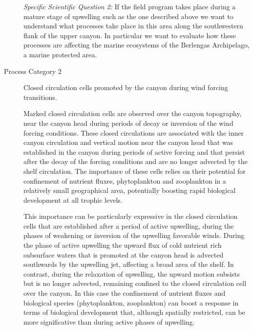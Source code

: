 \begin{description}
 
\textsl{Specific Scientific Question 2:} If the \proj field program
takes place during a mature stage of upwelling such as the one
described above we want to understand what processes take place in
this area along the southwestern flank of the upper \naz canyon. In
particular we want to evaluate how these processes are affecting the
marine ecosystems of the Berlengas Archipelago, a marine protected
area.

\item[Process Category 2] Closed circulation cells promoted by the
canyon during wind forcing transitions.

Marked closed circulation cells are observed over the canyon
topography, near the canyon head during periods of decay or inversion
of the wind forcing conditions. These closed circulations are
associated with the inner canyon circulation and vertical motion near
the canyon head that was established in the canyon during periods
of active forcing and that persist after the decay of the forcing
conditions and are no longer advected by the shelf circulation. The
importance of these cells relies on their potential for confinement of
nutrient fluxes, phytoplankton and zooplankton in a relatively small
geographical area, potentially boosting rapid biological development
at all trophic levels.

This importance can be particularly expressive in the closed
circulation cells that are established after a period of active
upwelling, during the phases of weakening or inversion of the
upwelling favorable winds. During the phase of active upwelling the
upward flux of cold nutrient rich subsurface waters that is
promoted at the canyon head is advected southwards by the upwelling
jet, affecting a broad area of the shelf. In contrast, during the
relaxation of upwelling, the upward motion subsists but is no longer
advected, remaining confined to the closed circulation cell over the
canyon. In this case the confinement of nutrient fluxes and biological
species (phytoplankton, zooplankton) can boost a response in terms of
biological development that, although spatially restricted, can be
more significative than during active phases of upwelling.


\end{description}
